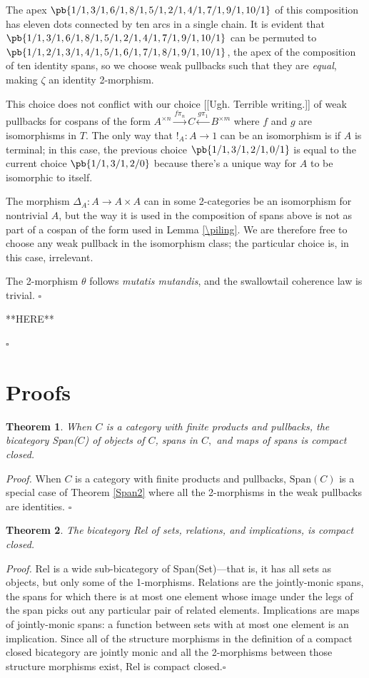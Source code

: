 \documentclass[12pt,twoside,openright]{report}
\newtheorem{thm}{Theorem}
\newcommand{\maps}{\colon}
\newcommand{\Span}{\mbox{Span}}
\begin{document}
The apex $\pb{1/1,3/1,6/1,8/1,5/1,2/1,4/1,7/1,9/1,10/1}$ of this composition has eleven dots connected by ten arcs in a single chain.  It is evident that $\pb{1/1,3/1,6/1,8/1,5/1,2/1,4/1,7/1,9/1,10/1}$ can be permuted to $\pb{1/1,2/1,3/1,4/1,5/1,6/1,7/1,8/1,9/1,10/1}$, the apex of the composition of ten identity spans, so we choose weak pullbacks such that they are {\em equal}, making $\zeta$ an identity 2-morphism.  

This choice does not conflict with our choice [[Ugh.  Terrible writing.]] of weak pullbacks for cospans of the form $A^{\times n} \stackrel{f\pi_n}{\to} C \stackrel{g\pi_1}{\leftarrow} B^{\times m}$ where $f$ and $g$ are isomorphisms in $T$.  The only way that $!_A\maps A \to 1$ can be an isomorphism is if $A$ is terminal; in this case, the previous choice $\pb{1/1,3/1,2/1,0/1}$ is equal to the current choice $\pb{1/1,3/1,2/0}$ because there's a unique way for $A$ to be isomorphic to itself.

The morphism $\Delta_A:A \to A\times A$ can in some 2-categories be an isomorphism for nontrivial $A$, but the way it is used in the composition of spans above is not as part of a cospan of the form used in Lemma \ref{\piling}.  We are therefore free to choose any weak pullback in the isomorphism class; the particular choice is, in this case, irrelevant.

The 2-morphism $\theta$ follows {\em mutatis mutandis}, and the swallowtail coherence law is trivial. \hfill $\square$

**HERE**

\hfill $\square$

\section{Proofs}
\label{proofs}
\begin{thm}
  \label{span}
  When $C$ is a category with finite products and pullbacks, the bicategory Span($C$) of objects of $C$, spans in $C,$ and maps of spans is compact closed.
\end{thm}
{\em Proof.} When $C$ is a category with finite products and pullbacks,
$\Span(C)$ is a special case of Theorem \ref{Span2} where all the
2-morphisms in the weak pullbacks are identities. \hfill $\square$

\begin{thm}
  The bicategory Rel of sets, relations, and implications, is compact closed.
\end{thm}
{\em Proof.} Rel is a wide sub-bicategory of Span(Set)---that is, it has all sets as objects, but only some of the 1-morphisms.  Relations are the jointly-monic spans, the spans for which there is at most one element whose image under the legs of the span picks out any particular pair of related elements.  Implications are maps of jointly-monic spans:
a function between sets with at most one element is an implication. Since all of the structure morphisms in the definition of a compact closed bicategory are jointly monic and all the 2-morphisms between those structure morphisms exist, Rel is compact closed.\hfill $\square$
\end{document}
